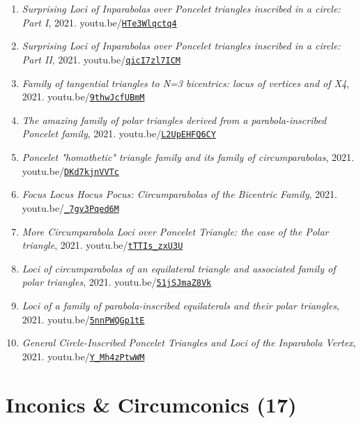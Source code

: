 \documentclass[12pt]{article}
\begin{document}
\begin{enumerate}[resume]
\item \textit{Surprising Loci of Inparabolas over Poncelet triangles inscribed in a circle: Part I}, 2021. youtu.be/\href{https://youtu.be/HTe3Wlqctq4}{\nolinkurl{HTe3Wlqctq4}}
\item \textit{Surprising Loci of Inparabolas over Poncelet triangles inscribed in a circle: Part II}, 2021. youtu.be/\href{https://youtu.be/qicI7zl7ICM}{\nolinkurl{qicI7zl7ICM}}
\item \textit{Family of tangential triangles to N=3 bicentrics: locus of vertices and of X4}, 2021. youtu.be/\href{https://youtu.be/9thwJcfUBmM}{\nolinkurl{9thwJcfUBmM}}
\item \textit{The amazing family of polar triangles derived from a parabola-inscribed Poncelet family}, 2021. youtu.be/\href{https://youtu.be/L2UpEHFQ6CY}{\nolinkurl{L2UpEHFQ6CY}}
\item \textit{Poncelet "homothetic" triangle family and its family of circumparabolas}, 2021. youtu.be/\href{https://youtu.be/DKd7kjnVVTc}{\nolinkurl{DKd7kjnVVTc}}
\item \textit{Focus Locus Hocus Pocus: Circumparabolas of the Bicentric Family}, 2021. youtu.be/\href{https://youtu.be/_7gv3Pqed6M}{\nolinkurl{\_7gv3Pqed6M}}
\item \textit{More Circumparabola Loci over Poncelet Triangle: the case of the Polar triangle}, 2021. youtu.be/\href{https://youtu.be/tTTIs_zxU3U}{\nolinkurl{tTTIs\_zxU3U}}
\item \textit{Loci of circumparabolas of an equilateral triangle and associated family of polar triangles}, 2021. youtu.be/\href{https://youtu.be/51jSJmaZ8Vk}{\nolinkurl{51jSJmaZ8Vk}}
\item \textit{Loci of a family of parabola-inscribed equilaterals and their polar triangles}, 2021. youtu.be/\href{https://youtu.be/5nnPWQGp1tE}{\nolinkurl{5nnPWQGp1tE}}
\item \textit{General Circle-Inscribed Poncelet Triangles and Loci of the Inparabola Vertex}, 2021. youtu.be/\href{https://youtu.be/Y_Mh4zPtwWM}{\nolinkurl{Y\_Mh4zPtwWM}}
\end{enumerate}

\section{Inconics \& Circumconics (17)}
\end{document}
